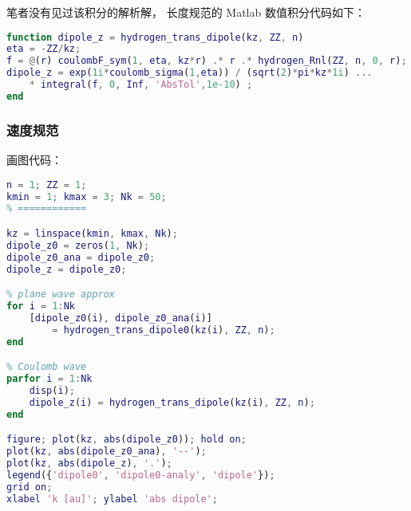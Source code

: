 笔者没有见过该积分的解析解， 长度规范的 Matlab 数值积分代码如下：

\begin{lstlisting}[language=matlab, caption=hydrogen\_trans\_dipole.m]
function dipole_z = hydrogen_trans_dipole(kz, ZZ, n)
eta = -ZZ/kz;
f = @(r) coulombF_sym(1, eta, kz*r) .* r .* hydrogen_Rnl(ZZ, n, 0, r);
dipole_z = exp(1i*coulomb_sigma(1,eta)) / (sqrt(2)*pi*kz*1i) ...
    * integral(f, 0, Inf, 'AbsTol',1e-10) ;
end
\end{lstlisting}

\subsubsection{速度规范}

画图代码：
\begin{lstlisting}[language=matlab,caption=plot\_hydrogen\_trans\_dipole.m]
% == params ==
n = 1; ZZ = 1;
kmin = 1; kmax = 3; Nk = 50;
% ============

kz = linspace(kmin, kmax, Nk);
dipole_z0 = zeros(1, Nk);
dipole_z0_ana = dipole_z0;
dipole_z = dipole_z0;

% plane wave approx
for i = 1:Nk
    [dipole_z0(i), dipole_z0_ana(i)]
        = hydrogen_trans_dipole0(kz(i), ZZ, n);
end

% Coulomb wave
parfor i = 1:Nk
    disp(i);
    dipole_z(i) = hydrogen_trans_dipole(kz(i), ZZ, n);
end

figure; plot(kz, abs(dipole_z0)); hold on;
plot(kz, abs(dipole_z0_ana), '--');
plot(kz, abs(dipole_z), '.');
legend({'dipole0', 'dipole0-analy', 'dipole'});
grid on;
xlabel 'k [au]'; ylabel 'abs dipole';
\end{lstlisting}
